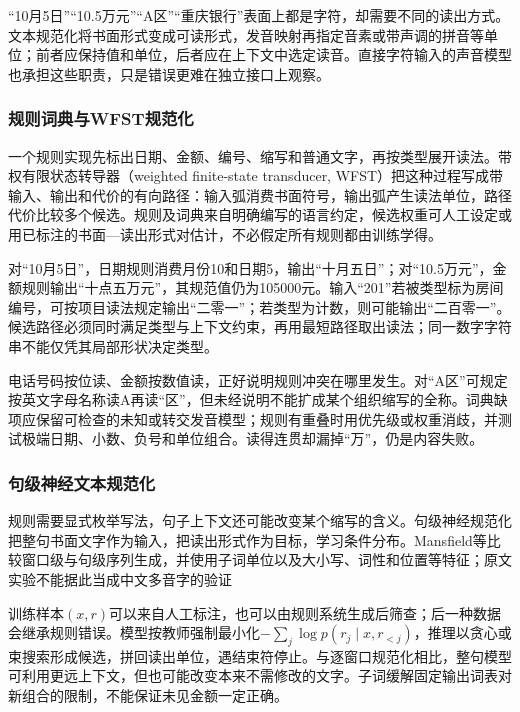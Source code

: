 “10月5日”“10.5万元”“A区”“重庆银行”表面上都是字符，却需要不同的读出方式。文本规范化将书面形式变成可读形式，发音映射再指定音素或带声调的拼音等单位；前者应保持值和单位，后者应在上下文中选定读音。直接字符输入的声音模型也承担这些职责，只是错误更难在独立接口上观察。

\subsubsection{规则词典与WFST规范化}
\label{sec:nlp-speech-wfst-normalization}

一个规则实现先标出日期、金额、编号、缩写和普通文字，再按类型展开读法。带权有限状态转导器（weighted finite-state transducer, WFST）把这种过程写成带输入、输出和代价的有向路径：输入弧消费书面符号，输出弧产生读法单位，路径代价比较多个候选。规则及词典来自明确编写的语言约定，候选权重可人工设定或用已标注的书面—读出形式对估计，不必假定所有规则都由训练学得。

对“10月5日”，日期规则消费月份10和日期5，输出“十月五日”；对“10.5万元”，金额规则输出“十点五万元”，其规范值仍为105000元。输入“201”若被类型标为房间编号，可按项目读法规定输出“二零一”；若类型为计数，则可能输出“二百零一”。候选路径必须同时满足类型与上下文约束，再用最短路径取出读法；同一数字字符串不能仅凭其局部形状决定类型。

电话号码按位读、金额按数值读，正好说明规则冲突在哪里发生。对“A区”可规定按英文字母名称读A再读“区”，但未经说明不能扩成某个组织缩写的全称。词典缺项应保留可检查的未知或转交发音模型；规则有重叠时用优先级或权重消歧，并测试极端日期、小数、负号和单位组合。读得连贯却漏掉“万”，仍是内容失败。

\subsubsection{句级神经文本规范化}
\label{sec:nlp-speech-neural-normalization}

规则需要显式枚举写法，句子上下文还可能改变某个缩写的含义。句级神经规范化把整句书面文字作为输入，把读出形式作为目标，学习条件分布。Mansfield等比较窗口级与句级序列生成，并使用子词单位以及大小写、词性和位置等特征；原文实验不能据此当成中文多音字的验证

训练样本$(x,r)$可以来自人工标注，也可以由规则系统生成后筛查；后一种数据会继承规则错误。模型按教师强制最小化$-\sum_j\log p(r_j\mid x,r_{<j})$，推理以贪心或束搜索形成候选，拼回读出单位，遇结束符停止。与逐窗口规范化相比，整句模型可利用更远上下文，但也可能改变本来不需修改的文字。子词缓解固定输出词表对新组合的限制，不能保证未见金额一定正确。

